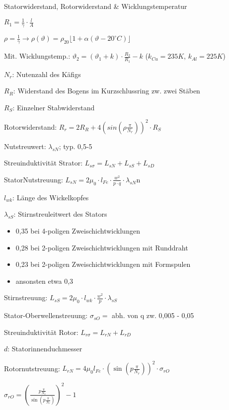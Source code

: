 \documentclass[german]{latex4ei/latex4ei_sheet}
\begin{document}
\begin{sectionbox}
\begin{bluebox}{Statorwiderstand, Rotorwiderstand \& Wicklungstemperatur}
					\item $R_1 = \frac{1}{\gamma}\cdot \frac{l}{A}$
					\item $\rho = \frac{1}{\gamma}\rightarrow \rho(\vartheta) = \rho_{20}\lfloor 1+\alpha(\vartheta -20^\circ C) \rfloor $
					\item Mit. Wicklungstemp.:  $\vartheta_2 = (\vartheta_1+k)\cdot \frac{R_2}{R_1}-k$ ($k_{Cu} = 235K$, $k_{Al} = 225K$)
					\item $N_r$: Nutenzahl des Käfigs
					\item $R_R$: Widerstand des Bogens im Kurzschlussring zw. zwei Stäben
					\item $R_S$: Einzelner Stabwiderstand
					\item Rotorwiderstand: $R_r = 2R_R+4\left(sin\left(\rho\frac{\pi}{N_r}\right)\right)^2\cdot R_S$  
					\item Nutstreuwert: $\lambda_{sN}$; typ. 0,5-5
					\item Streuinduktivität Strator: $L_{s\sigma} = L_{sN}+L_{sS}+L_{sD}$
					\item StatorNutstreuung: $L_{sN} =2\mu_0\cdot l_{Fe}\cdot \frac{w^2}{p\cdot q}\cdot \lambda_{sN}$n
					\item $l_{wk}$: Länge des Wickelkopfes
					\item $\lambda_{sS}$: Stirnstreuleitwert des Stators
					\begin{itemize}
						\item 0,35 bei 4-poligen Zweischichtwicklungen
						\item 0,28 bei 2-poligen Zweischichtwicklungen mit Runddraht
						\item 0,23 bei 2-poligen Zweischichtwicklungen mit Formspulen
						\item ansonsten etwa 0,3
					\end{itemize}
					\item Stirnstreuung: $L_{sS} = 2\mu_0\cdot l_{wk}\cdot \frac{w^2}{p}\cdot \lambda_{sS}$
					\item Stator-Oberwellenstreuung: $\sigma_{sO}=$ abh. von q zw. 0,005 - 0,05 
					\item Streuinduktivität Rotor: $L_{r\sigma} = L_{rN}+L_{rD}$
					\item $d$: Statorinnenduchmesser
					\item Rotornutstreuung: $L_{rN} = 4\mu_0 l_{Fe}\cdot \left(\sin\left(p\frac{\pi}{N_r}\right)\right)^2\cdot \sigma_{rO}$
					\item $\sigma_{rO} = \left( \frac{p\frac{\pi}{N_r}}{\sin(p\frac{\pi}{N_r})}\right)^2-1$
				\end{bluebox}

\end{sectionbox}
\end{document}
